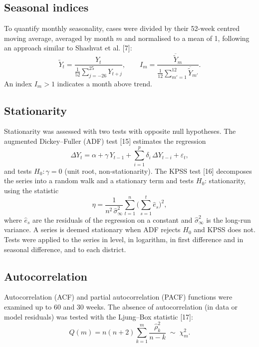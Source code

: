 \documentclass[11pt]{article}
\begin{document}
\subsection{Seasonal indices}
To quantify monthly seasonality, cases were divided by their 52-week centred moving average, averaged by month $m$ and normalised to a mean of 1, following an approach similar to Shashvat et al. [7]:
\begin{equation}
\tilde{Y}_t=\frac{Y_t}{\frac{1}{52}\sum_{j=-26}^{25}Y_{t+j}},\qquad I_m=\frac{\overline{\tilde{Y}}_{m}}{\frac{1}{12}\sum_{m'=1}^{12}\overline{\tilde{Y}}_{m'}} .
\label{eq:indice}
\end{equation}
An index $I_m>1$ indicates a month above trend.

\subsection{Stationarity}
Stationarity was assessed with two tests with opposite null hypotheses. The augmented Dickey–Fuller (ADF) test [15] estimates the regression
\begin{equation}
\Delta Y_t=\alpha+\gamma\,Y_{t-1}+\sum_{i=1}^{p}\delta_i\,\Delta Y_{t-i}+\varepsilon_t ,
\label{eq:adf}
\end{equation}
and tests $H_0:\gamma=0$ (unit root, non-stationarity). The KPSS test [16] decomposes the series into a random walk and a stationary term and tests $H_0$: stationarity, using the statistic
\begin{equation}
\eta=\frac{1}{n^{2}\,\hat{\sigma}^{2}_{\infty}}\sum_{t=1}^{n}\Big(\sum_{s=1}^{t}\hat{e}_s\Big)^{2},
\label{eq:kpss}
\end{equation}
where $\hat{e}_s$ are the residuals of the regression on a constant and $\hat{\sigma}^{2}_{\infty}$ is the long-run variance. A series is deemed stationary when ADF rejects $H_0$ and KPSS does not. Tests were applied to the series in level, in logarithm, in first difference and in seasonal difference, and to each district.

\subsection{Autocorrelation}
Autocorrelation (ACF) and partial autocorrelation (PACF) functions were examined up to 60 and 30 weeks. The absence of autocorrelation (in data or model residuals) was tested with the Ljung–Box statistic [17]:
\begin{equation}
Q(m)=n(n+2)\sum_{k=1}^{m}\frac{\hat{\rho}_k^{2}}{n-k}\;\sim\;\chi^{2}_{m} .
\label{eq:lb}
\end{equation}
\end{document}
